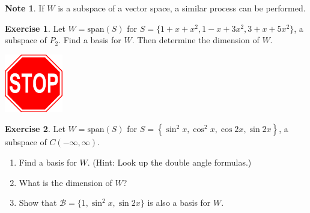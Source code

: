 \documentclass{beamer}
\newcommand{\fn}{\insertframenumber}
\theoremstyle{definition}
\newtheorem{exercise}{Exercise}
\newtheorem*{nb}{Note}
\begin{document}
\begin{frame}{\fn}
	\begin{nb}
		If $W$ is a subspace of a vector space, a similar process can be performed.
	\end{nb}
	\begin{exercise}
		Let $W=\mathrm{span}(S)$ for $S=\{1+x+x^2,1-x+3x^2,3+x+5x^2\}$, a subspace of $P_2$.  Find a basis for $W$.  Then determine the dimension of $W$.
	\end{exercise}
	\begin{center}
		\includegraphics[width=1in]{images/stop}
	\end{center}
\end{frame}

\begin{frame}{\fn}
	\begin{exercise}
		Let $W=\mathrm{span}(S)$ for $S=\left\{\sin^2 x,\cos^2 x,\cos 2x,\sin 2x\right\}$, a subspace of $C(-\infty,\infty)$.  
		\begin{enumerate}[label=(\alph*)]
			\item Find a basis for $W$. (Hint: Look up the double angle formulas.)
			\item  What is the dimension of $W$?
			\pause
			\item Show that $\mathcal{B}=\{1,\sin^2 x,\sin 2x\}$ is also a basis for $W$.
		\end{enumerate}
	\end{exercise}
\end{frame}
\end{document}
